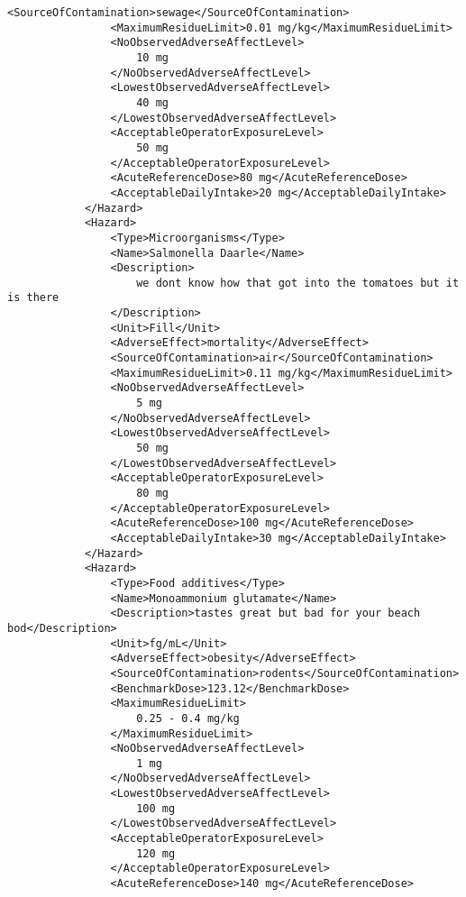 \begin{lstlisting}[language=RAKIP, caption={Example of GenericModel}]
                <SourceOfContamination>sewage</SourceOfContamination>
                <MaximumResidueLimit>0.01 mg/kg</MaximumResidueLimit>
                <NoObservedAdverseAffectLevel>
                    10 mg
                </NoObservedAdverseAffectLevel>
                <LowestObservedAdverseAffectLevel>
                    40 mg
                </LowestObservedAdverseAffectLevel>
                <AcceptableOperatorExposureLevel>
                    50 mg
                </AcceptableOperatorExposureLevel>
                <AcuteReferenceDose>80 mg</AcuteReferenceDose>
                <AcceptableDailyIntake>20 mg</AcceptableDailyIntake>
            </Hazard>
            <Hazard>
                <Type>Microorganisms</Type>
                <Name>Salmonella Daarle</Name>
                <Description>
                    we dont know how that got into the tomatoes but it is there
                </Description>
                <Unit>Fill</Unit>
                <AdverseEffect>mortality</AdverseEffect>
                <SourceOfContamination>air</SourceOfContamination>
                <MaximumResidueLimit>0.11 mg/kg</MaximumResidueLimit>
                <NoObservedAdverseAffectLevel>
                    5 mg
                </NoObservedAdverseAffectLevel>
                <LowestObservedAdverseAffectLevel>
                    50 mg
                </LowestObservedAdverseAffectLevel>
                <AcceptableOperatorExposureLevel>
                    80 mg
                </AcceptableOperatorExposureLevel>
                <AcuteReferenceDose>100 mg</AcuteReferenceDose>
                <AcceptableDailyIntake>30 mg</AcceptableDailyIntake>
            </Hazard>
            <Hazard>
                <Type>Food additives</Type>
                <Name>Monoammonium glutamate</Name>
                <Description>tastes great but bad for your beach bod</Description>
                <Unit>fg/mL</Unit>
                <AdverseEffect>obesity</AdverseEffect>
                <SourceOfContamination>rodents</SourceOfContamination>
                <BenchmarkDose>123.12</BenchmarkDose>
                <MaximumResidueLimit>
                    0.25 - 0.4 mg/kg
                </MaximumResidueLimit>
                <NoObservedAdverseAffectLevel>
                    1 mg
                </NoObservedAdverseAffectLevel>
                <LowestObservedAdverseAffectLevel>
                    100 mg
                </LowestObservedAdverseAffectLevel>
                <AcceptableOperatorExposureLevel>
                    120 mg
                </AcceptableOperatorExposureLevel>
                <AcuteReferenceDose>140 mg</AcuteReferenceDose>

\end{lstlisting}
